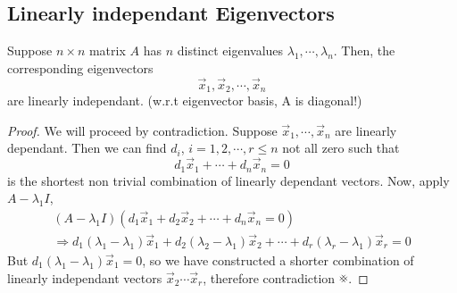 \documentclass{article}
\numberwithin{equation}{section}
\begin{document}
\subsection{Linearly independant Eigenvectors}
\begin{thm}
    Suppose $n \times n$ matrix $A$ has $n$ distinct eigenvalues $\lambda_1, \cdots, \lambda_n$.
    Then, the corresponding eigenvectors
    \begin{equation}\label{eq:5-6}
        \vec x_1, \vec x_2, \cdots, \vec x_n
    \end{equation}
    are linearly independant.
    (w.r.t eigenvector basis, A is diagonal!)
\end{thm}
\begin{proof}
    We will proceed by contradiction. Suppose $\vec x_1, \cdots, \vec x_n$ are linearly dependant.
    Then we can find $d_i$, $i = 1, 2, \cdots, r \leq n$ not all zero such that
    \[
        d_1 \vec x_1 + \cdots + d_n \vec x_n = 0  
    \]
    is the shortest non trivial combination of linearly dependant vectors.
    Now, apply $A - \lambda_1 I$,
    \begin{align*}
        (A - \lambda_1 I)(d_1 \vec x_1 + d_2 \vec x_2 + \cdots + d_n \vec x_n = 0) \\
        \Rightarrow d_1 (\lambda_1 - \lambda_ 1) \vec x_1 + d_2 (\lambda_2 - \lambda_1) \vec x_2 + \cdots + d_r (\lambda_r - \lambda_1) \vec x_r = 0
    \end{align*}
    But $d_1 (\lambda_1 - \lambda_ 1) \vec x_1 = 0$, so we have constructed a shorter combination of linearly independant vectors $\vec x_2 \cdots \vec x_r$, therefore contradiction $\contradiction$. 
\end{proof}
\end{document}

